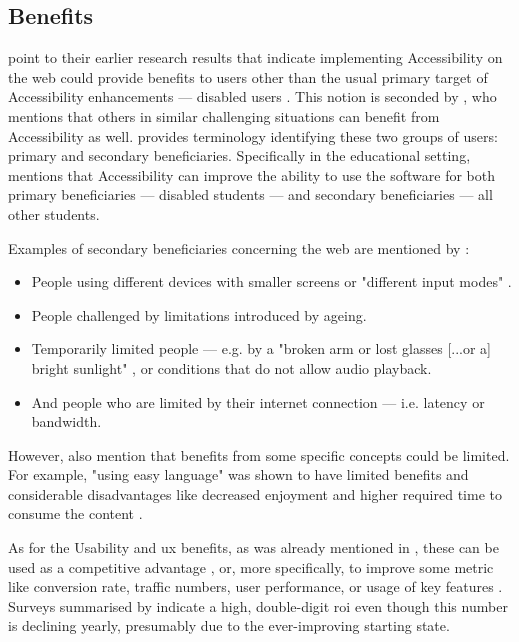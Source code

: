 \subsection{Benefits}
\label{Literature-HSIE-Benefits}

\textcite{Juergen_et_all_2020} point to their earlier research results that indicate implementing Accessibility on the web could provide benefits to users other than the usual primary target of Accessibility enhancements --- disabled users \parencite{Schmutz_Sonderegger_Sauer_2016, Schmutz_Sonderegger_Sauer_2017, Schmutz_Sonderegger_Sauer_2018}.
This notion is seconded by \textcite{Vanderheiden_2000}, who mentions that others in similar challenging situations can benefit from Accessibility as well.
\textcite{Edyburn_2010} provides terminology identifying these two groups of users: primary and secondary beneficiaries. Specifically in the educational setting, \textcite{Edyburn_2021} mentions that Accessibility can improve the ability to use the software for both primary beneficiaries --- disabled students --- and secondary beneficiaries --- all other students.

Examples of secondary beneficiaries concerning the web are mentioned by \textcite{WAI_Intro}:

\begin{itemize}
    \item People using different devices with smaller screens or "different input modes" \parencite{WAI_Intro}.
    \item People challenged by limitations introduced by ageing.
    \item Temporarily limited people --- e.g. by a "broken arm or lost glasses [...or a] bright sunlight" \parencite{WAI_Intro}, or conditions that do not allow audio playback.
    \item And people who are limited by their internet connection --- i.e. latency or bandwidth.
\end{itemize}

However, \textcite{Juergen_et_all_2020} also mention that benefits from some specific concepts could be limited. For example, "using easy language" \parencite[p. 1210]{Juergen_et_all_2020} was shown to have limited benefits and considerable disadvantages like decreased enjoyment and higher required time to consume the content \parencite{Schmutz_Sonderegger_Sauer_2019}.

As for the Usability and \gls{ux} benefits, as was already mentioned in , these can be used as a competitive advantage \parencite{Wegge_Zimmermann_2007}, or, more specifically, to improve some metric like conversion rate, traffic numbers, user performance, or usage of key features \parencite{Nielsen_2008}.
Surveys summarised by \textcite{Nielsen_2008} indicate a high, double-digit \gls{roi} even though this number is declining yearly, presumably due to the ever-improving starting state.

